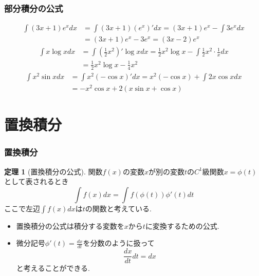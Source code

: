 \documentclass[dvipdfmx,cjk,10.2pt]{beamer}
\theoremstyle{definition}
\newtheorem{Thm}{定理}[section]
\begin{document}



\begin{frame}
\frametitle{部分積分の公式}


\begin{align*}
\int (3x+1)e^{x}dx & = \int (3x+1) (e^{x})'dx = (3x+1)e^x -\int 3 e^x dx \\
& = (3x+1)e^x-3e^x=(3x-2)e^x
\end{align*}
\begin{align*}
\int x \log x dx & = \int (\frac{1}{2}x^2)'\log x dx = \frac{1}{2}x^2 \log x - \int \frac{1}{2}x^2 \cdot \frac{1}{x}dx \\
& =  \frac{1}{2}x^2 \log x -\frac{1}{4}x^2
\end{align*}
\begin{align*}
\int x^2 \sin x dx & = \int x^2(-\cos x)'dx = x^2(-\cos x) + \int 2x \cos x dx \\
& = -x^2 \cos x +2(x\sin x + \cos x)
\end{align*}


\end{frame}



\section{置換積分}

\begin{frame}
\frametitle{置換積分}

\begin{Thm}[置換積分の公式] \label{置換積分の公式}
関数$f(x)$の変数$x$が別の変数$t$の$C^1$級関数$x=\phi(t)$として表されるとき
$$
\int f(x)dx =\int f(\phi(t))\phi'(t)dt
$$
ここで左辺$\int f(x)dx$は$t$の関数と考えている. 
\end{Thm}
\begin{itemize}
\item 置換積分の公式は積分する変数を$x$から$t$に変換するための公式. 
\item  微分記号$\phi'(t)=\frac{dx}{dt}$を分数のように扱って
 $$
 \frac{dx}{dt} dt = dx
 $$
 と考えることができる. 
 \end{itemize}
\end{frame}
\end{document}
